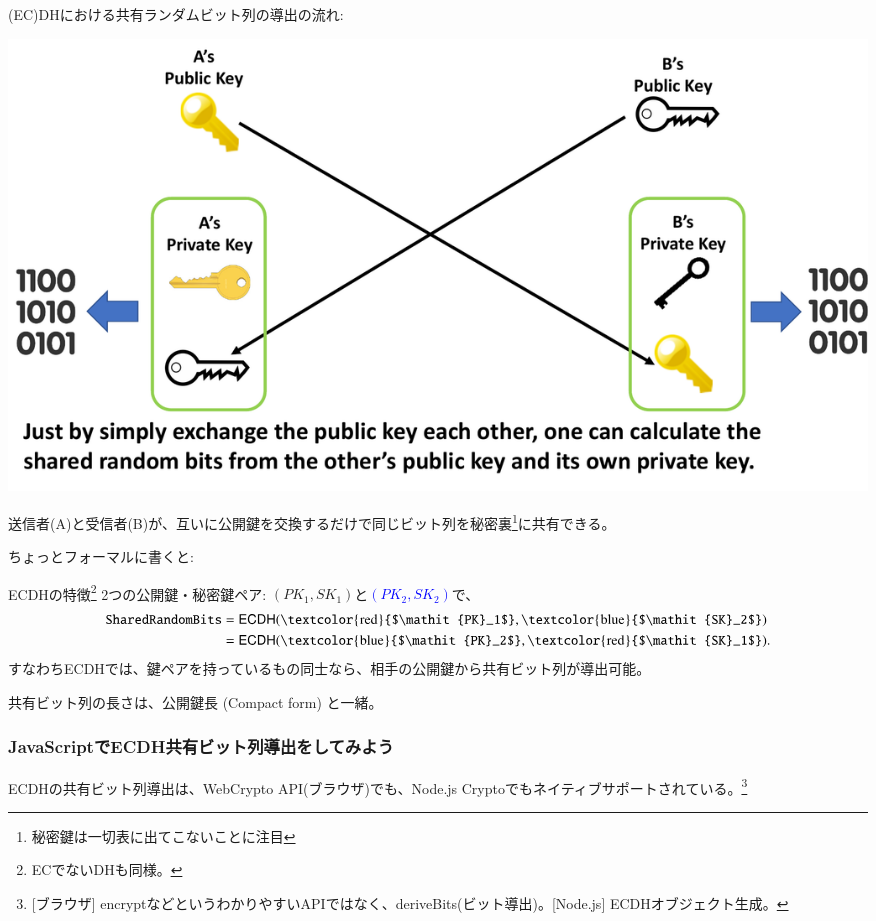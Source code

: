 \documentclass[12pt,dvipdfmx]{beamer}
\begin{document}
\begin{frame}
(EC)DHにおける共有ランダムビット列の導出の流れ:
\begin{center}
 \includegraphics[width=\linewidth]{Figs/ecdh-flow02.pdf}
\end{center}
\vspace{-1ex}
送信者(A)と受信者(B)が、\alert{互いに公開鍵を交換するだけで同じビット列を秘密裏\footnote[frame]{\scriptsize 秘密鍵は一切表に出てこないことに注目}に共有}できる。
\end{frame}

\begin{frame}
ちょっとフォーマルに書くと:
\begin{block}{\small ECDHの特徴\footnote[frame]{\scriptsize ECでないDHも同様。}}
2つの公開鍵・秘密鍵ペア: \alert{$(\mathit{PK_1}, \mathit{SK}_1)$}と\textcolor{blue}{$(\mathit{PK_2}, \mathit{SK}_2)$}で、
\begin{align*}
\mathtt{SharedRandomBits} &= \mathsf{ECDH}(
\text{\textcolor{red}{$\mathit{PK}_1$}},
\text{\textcolor{blue}{$\mathit{SK}_2$}}
)\\
& = \mathsf{ECDH}(
\text{\textcolor{blue}{$\mathit{PK}_2$}},
\text{\textcolor{red}{$\mathit{SK}_1$}}
).
\end{align*}
すなわちECDHでは、\alert{鍵ペアを持っているもの同士なら、相手の公開鍵から共有ビット列が導出可能}。
\end{block}

共有ビット列の長さは、公開鍵長 (Compact form) と一緒。
\end{frame}

\begin{frame}
\frametitle{JavaScriptでECDH共有ビット列導出をしてみよう}
ECDHの共有ビット列導出は、WebCrypto API(ブラウザ)でも、Node.js Cryptoでもネイティブサポートされている。\footnote[frame]{\scriptsize [ブラウザ] encryptなどというわかりやすいAPIではなく、deriveBits(ビット導出)。[Node.js] ECDHオブジェクト生成。}

\end{frame}
\end{document}
